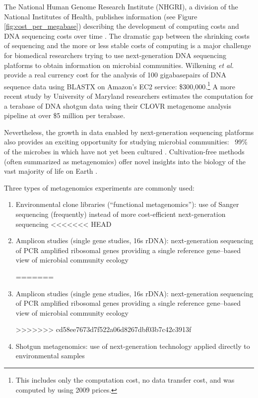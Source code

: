 \documentclass[12pt,fullpage]{report}
\begin{document}
The National Human Genome Research Institute (NHGRI), a division of the National Institutes of Health, publishes information (see Figure \ref{fig:cost_per_megabase}) describing the development of computing costs and DNA sequencing costs over time \cite{NHGRI_COST}. The dramatic gap between the shrinking costs of sequencing and the more or less stable costs of computing is a major challenge for biomedical researchers trying to use next-generation DNA sequencing platforms to obtain information on microbial communities. Wilkening \textit{et al.} \cite{MGCLOUD} provide a real currency cost for the analysis of 100 gigabasepairs of DNA sequence data using BLASTX on Amazon's \gls{EC2} service: \$300,000.\footnote{This includes only the computation cost, no data transfer cost, and was computed by using 2009 prices.} A more recent study by University of Maryland researchers \cite{CLOVR} estimates the computation for a terabase of DNA shotgun data using their CLOVR metagenome analysis pipeline at over \$5 million per terabase.


Nevertheless, the growth in data enabled by next-generation sequencing platforms also provides an exciting opportunity for studying microbial communities: ~99\% of the microbes in which have not yet been cultured \cite{MGREVIEW}. Cultivation-free methods (often summarized as metagenomics) offer novel insights into the biology of the vast majority of life on Earth \cite{THOMASREVIEW}.

Three types of metagenomics experiments are commonly used:

\begin{enumerate}

\item Environmental clone libraries (``functional metagenomics”):
use of Sanger sequencing (frequently) instead of more cost-efficient next-generation sequencing
<<<<<<< HEAD

\item Amplicon studies (single gene studies, \gls{16s} rDNA):
next-generation sequencing of PCR amplified ribosomal genes providing a single reference gene--based view of microbial community ecology

=======

\item Amplicon studies (single gene studies, \gls{16s} rDNA):
next-generation sequencing of PCR amplified ribosomal genes providing a single reference gene--based view of microbial community ecology

>>>>>>> cd58ee7673d7f522a06d8267dbf03b7c42c3913f
\item Shotgun metagenomics: 
use of next-generation technology applied directly to environmental samples
\end{enumerate}
\end{document}
